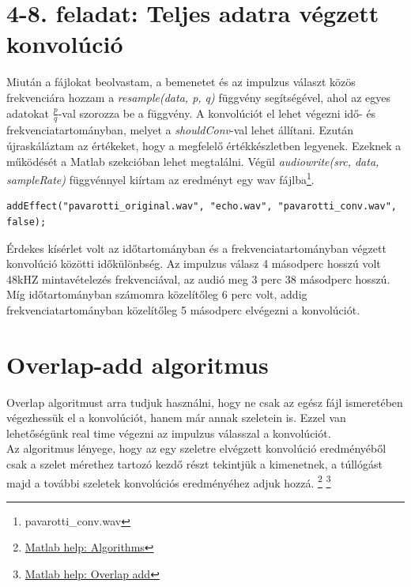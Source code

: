 \documentclass{article}
\begin{document}
\section*{4-8. feladat: Teljes adatra végzett konvolúció}
	Miután a fájlokat beolvastam, a bemenetet és az impulzus választ közös frekvenciára hozzam a \textit{resample(data, p, q)} függvény segítségével, ahol az egyes adatokat $\frac{p}{q}$-val szorozza be a függvény. A konvolúciót el lehet végezni idő- és frekvenciatartományban, melyet a \textit{shouldConv}-val lehet állítani. Ezután újraskáláztam az értékeket, hogy a megfelelő értékkészletben legyenek. Ezeknek a működését a Matlab szekcióban lehet megtalálni. Végül \textit{audiowrite(src, data, sampleRate)} függvénnyel kiírtam az eredményt egy wav fájlba\footnote{pavarotti\_conv.wav}.
	\begin{lstlisting}
addEffect("pavarotti_original.wav", "echo.wav", "pavarotti_conv.wav", false);
	\end{lstlisting}
	
	Érdekes kísérlet volt az időtartományban és a frekvenciatartományban végzett konvolúció közötti időkülönbség. Az impulzus válasz 4 másodperc hosszú volt 48kHZ mintavételezés frekvenciával, az audió meg 3 perc 38 másodperc hosszú. Míg időtartományban számomra közelítőleg 6 perc volt, addig frekvenciatartományban közelítőleg 5 másodperc elvégezni a konvolúciót.

\section*{Overlap-add algoritmus}
	Overlap algoritmust arra tudjuk használni, hogy ne csak az egész fájl ismeretében végezhessük el a konvolúciót, hanem már annak szeletein is. Ezzel van lehetőségünk real time végezni az impulzus válasszal a konvolúciót. \\
	Az algoritmus lényege, hogy az egy szeletre elvégzett konvolúció eredményéből csak a szelet mérethez tartozó kezdő részt tekintjük a kimenetnek, a túllógást majd a további szeletek konvolúciós eredményéhez adjuk hozzá.
	\footnote{\href{https://www.mathworks.com/help/signal/ref/fftfilt.html\#mw_80e5adbd-8d4e-43f8-b26b-b417d8b80465}{Matlab help: Algorithms}}
	\footnote{\href{https://www.mathworks.com/help/dsp/ug/overlap-add-save.html}{Matlab help: Overlap add}}
\end{document}
